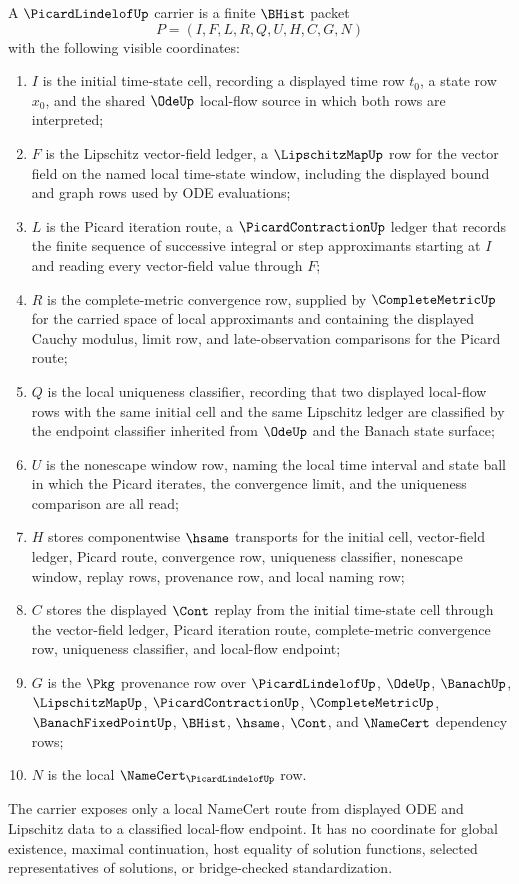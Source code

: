 \begin{definition}
\label{def:picard-lindelof-carrier}
A $\PicardLindelofUp$ carrier is a finite $\BHist$ packet
$$
P=(I,F,L,R,Q,U,H,C,G,N)
$$
with the following visible coordinates:
\begin{enumerate}
\item $I$ is the initial time-state cell, recording a displayed time row $t_0$, a state row $x_0$, and the shared $\OdeUp$ local-flow source in which both rows are interpreted;
\item $F$ is the Lipschitz vector-field ledger, a $\LipschitzMapUp$ row for the vector field on the named local time-state window, including the displayed bound and graph rows used by ODE evaluations;
\item $L$ is the Picard iteration route, a $\PicardContractionUp$ ledger that records the finite sequence of successive integral or step approximants starting at $I$ and reading every vector-field value through $F$;
\item $R$ is the complete-metric convergence row, supplied by $\CompleteMetricUp$ for the carried space of local approximants and containing the displayed Cauchy modulus, limit row, and late-observation comparisons for the Picard route;
\item $Q$ is the local uniqueness classifier, recording that two displayed local-flow rows with the same initial cell and the same Lipschitz ledger are classified by the endpoint classifier inherited from $\OdeUp$ and the Banach state surface;
\item $U$ is the nonescape window row, naming the local time interval and state ball in which the Picard iterates, the convergence limit, and the uniqueness comparison are all read;
\item $H$ stores componentwise $\hsame$ transports for the initial cell, vector-field ledger, Picard route, convergence row, uniqueness classifier, nonescape window, replay rows, provenance row, and local naming row;
\item $C$ stores the displayed $\Cont$ replay from the initial time-state cell through the vector-field ledger, Picard iteration route, complete-metric convergence row, uniqueness classifier, and local-flow endpoint;
\item $G$ is the $\Pkg$ provenance row over $\PicardLindelofUp$, $\OdeUp$, $\BanachUp$, $\LipschitzMapUp$, $\PicardContractionUp$, $\CompleteMetricUp$, $\BanachFixedPointUp$, $\BHist$, $\hsame$, $\Cont$, and $\NameCert$ dependency rows;
\item $N$ is the local $\NameCert_{\PicardLindelofUp}$ row.
\end{enumerate}
The carrier exposes only a local NameCert route from displayed ODE and Lipschitz data to a classified local-flow endpoint. It has no coordinate for global existence, maximal continuation, host equality of solution functions, selected representatives of solutions, or bridge-checked standardization.
\end{definition}


